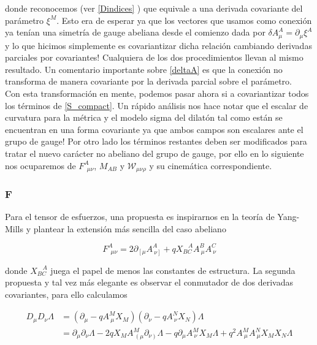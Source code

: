 \documentclass{article}
\numberwithin{equation}{section}
\begin{document}
donde reconocemos (ver \ref{Dindices} ) que equivale a una derivada covariante del parámetro $ \xi^M $. Esto era de esperar ya que los vectores que usamos como conexión ya tenían una simetría de gauge abeliana desde el comienzo dada por $ \delta A^A_{\mu} = \partial_{\mu} \xi^A $ y lo que hicimos simplemente es covariantizar dicha relación cambiando derivadas parciales por covariantes! Cualquiera de los dos procedimientos llevan al mismo resultado. Un comentario importante sobre \ref{deltaA} es que la conexión no transforma de manera covariante por la derivada parcial sobre el parámetro.\\



Con esta transformación en mente, podemos pasar ahora si a covariantizar todos los términos de \ref{S_compact}. Un rápido análisis nos hace notar que el escalar de curvatura para la métrica y el modelo sigma del dilatón tal como están se encuentran en una forma covariante ya que ambos campos son escalares ante el grupo de gauge! Por otro lado los términos restantes deben ser modificados para tratar el nuevo carácter no abeliano del grupo de gauge, por ello en lo siguiente nos ocuparemos de $ F^A_{\ \ \mu \nu} $, $ M_{A B} $ y $ \mathcal{W}_{\mu \nu \rho} $ y su cinemática correspondiente.

\subsubsection{F}

Para el tensor de esfuerzos, una propuesta es inspirarnos en la teoría de Yang-Mills y plantear la extensión más sencilla del caso abeliano

\begin{boxquation}
\begin{equation}\label{Fgauged}
F^A_{\ \ \mu \nu} = 2 \partial_{\left[ \mu\right.} A^A_{\ \left. \nu \right]} + q X_{B C}^{\ \ \ \ A} A^B_{\ \mu} A^C_{\ \nu} 
\end{equation}
\end{boxquation}


donde $ X_{B C}^{\ \ \ \ A} $ juega el papel de menos las constantes de estructura. La segunda propuesta y tal vez más elegante es observar el conmutador de dos derivadas covariantes, para ello calculamos

\begin{equation}\label{DmuDnu}
\begin{aligned}
D_{\mu}D_{\nu} \Lambda &= \left( \partial_{\mu} - q A^M_{\ \mu} X_M\right) \left( \partial_{\nu} - q A^N_{\ \nu} X_N\right) \Lambda\\
&= \partial_{\mu} \partial_{\nu} \Lambda - 2q X_M A^M_{\ \left( \mu \right.} \partial_{\left. \nu\right)} \Lambda - q \partial_{\mu} A^M_{\ \nu} X_M \Lambda + q^2 A^M_{\ \mu} A^N_{\ \mu} X_M X_N \Lambda\\
\end{aligned}
\end{equation}
\end{document}
